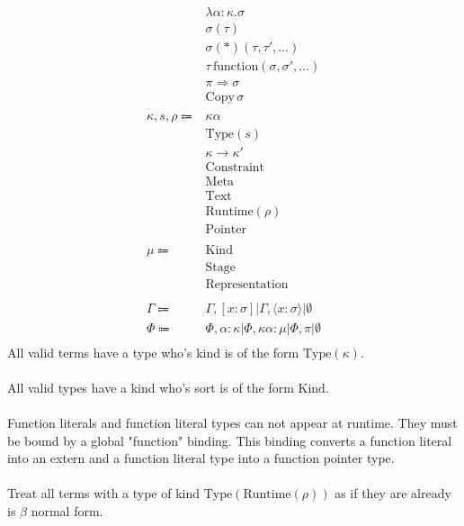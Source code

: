 \documentclass {article}
\begin{document}
\begin{align*}
& \lambda \alpha : \kappa. \sigma \tag*{[Type Operator]} \\
& \sigma (\tau) \tag*{[Type Construction]} \\
& \sigma (*) (\tau, \tau', \dots) \tag*{[Function Pointer]}\\
& \tau \, \text{function}(\sigma, \sigma', \dots) \tag*{[Function Literal Type]} \\
& \pi \Rightarrow \sigma \tag*{[Erased Qualified Type]} \\
& \text{Copy} \, \sigma \tag*{[Runtime Copyable Constraint]} \\
\\
\kappa, s, \rho \Coloneqq &  \kappa \alpha \tag*{[Kind Variable]} \\
& \text{Type} (s) \tag*{[Type]} \\
& \kappa \to \kappa' \tag*{[Higher Kinded Type]} \\
& \text{Constraint} \tag*{[Constraint]} \\
& \text{Meta} \tag*{[Meta Stage]}\\
& \text{Text} \tag*{[Symbol Stage]} \\
& \text{Runtime} (\rho) \tag*{[Runtime Stage]}\\
& \text{Pointer} \tag*{[Pointer Representation]}\\
\\
\mu \Coloneqq & \text{Kind} \\
& \text{Stage} \\
& \text{Representation} \\
\\
\Gamma \Coloneqq & \Gamma, [x : \sigma] | \Gamma, \langle x : \sigma \rangle | \emptyset \\
\Phi \Coloneqq & \Phi, \alpha : \kappa | \Phi, \kappa \alpha : \mu | \Phi, \pi|  \emptyset \\
\end{align*}
All valid terms have a type who's kind is of the form $ \text{Type} (\kappa) $. \\
\\
All valid types have a kind who's sort is of the form $ \text{Kind} $.\\
\\
Function literals and function literal types can not appear at runtime. They must be bound by a global "function" binding.
This binding converts a function literal into an extern and a function literal type into a function pointer type. \\
\\
Treat all terms with a type of kind $ \text{Type} (\text{Runtime} (\rho)) $ as if they are already is $ \beta $ normal form. \\
\end{document}
